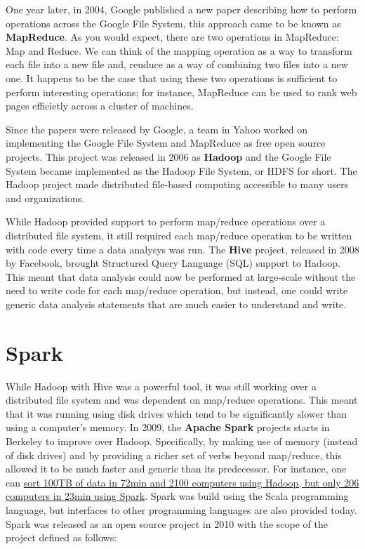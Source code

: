 \documentclass[]{book}
\theoremstyle{definition}
\theoremstyle{definition}
\theoremstyle{definition}
\theoremstyle{remark}
\begin{document}
One year later, in 2004, Google published a new paper describing how to
perform operations across the Google File System, this approach came to
be known as \textbf{MapReduce}. As you would expect, there are two
operations in MapReduce: Map and Reduce. We can think of the mapping
operation as a way to transform each file into a new file and, reuduce
as a way of combining two files into a new one. It happens to be the
case that using these two operations is sufficient to perform
interesting operations; for instance, MapReduce can be used to rank web
pages efficietly across a cluster of machines.

Since the papers were released by Google, a team in Yahoo worked on
implementing the Google File System and MapReduce as free open source
projects. This project was released in 2006 as \textbf{Hadoop} and the
Google File System became implemented as the Hadoop File System, or HDFS
for short. The Hadoop project made distributed file-based computing
accessible to many users and organizations.

While Hadoop provided support to perform map/reduce operations over a
distributed file system, it still required each map/reduce operation to
be written with code every time a data analysys was run. The
\textbf{Hive} project, released in 2008 by Facebook, brought Structured
Query Language (SQL) support to Hadoop. This meant that data analysis
could now be performed at large-scale without the need to write code for
each map/reduce operation, but instead, one could write generic data
analysis statements that are much easier to understand and write.

\section{Spark}\label{spark}

While Hadoop with Hive was a powerful tool, it was still working over a
distributed file system and was dependent on map/reduce operations. This
meant that it was running using disk drives which tend to be
significantly slower than using a computer's memory. In 2009, the
\textbf{Apache Spark} projects starts in Berkeley to improve over
Hadoop. Specifically, by making use of memory (instead of disk drives)
and by providing a richer set of verbs beyond map/reduce, this allowed
it to be much faster and generic than its predecessor. For instance, one
can
\href{https://databricks.com/blog/2014/11/05/spark-officially-sets-a-new-record-in-large-scale-sorting.html}{sort
100TB of data in 72min and 2100 computers using Hadoop, but only 206
computers in 23min using Spark}. Spark was build using the Scala
programming language, but interfaces to other programming languages are
also provided today. Spark was released as an open source project in
2010 with the scope of the project defined as follows:
\end{document}
